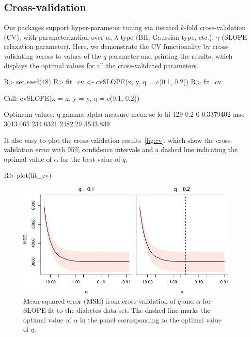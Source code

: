 \documentclass[article]{jss}
\makeatletter
\let\natwidth\Gin@nat@width
\makeatother
\begin{document}
\subsection{Cross-validation}

Our packages support hyper-parameter tuning via iterated \(k\)-fold
cross-validation (CV), with parameterization over \(\alpha\), \(\lambda\) type (BH,
Gaussian type, etc.), \(\gamma\) (SLOPE relaxation parameter).
Here, we demonstrate the CV functionality by cross-validating across
to values of the \(q\) parameter and printing the results,
which displays the optimal values for all the cross-validated parameters.

\begin{CodeChunk}
  \begin{CodeInput}
R> set.seed(48)
R> fit_cv <- cvSLOPE(x, y, q = c(0.1, 0.2))
R> fit_cv
\end{CodeInput}
  \begin{CodeOutput}
Call:
cvSLOPE(x = x, y = y, q = c(0.1, 0.2))

Optimum values:
      q gamma     alpha measure     mean       se      lo       hi
129 0.2     0 0.3379402     mse 3013.065 234.6321 2482.29 3543.839
\end{CodeOutput}
\end{CodeChunk}

It also easy to plot the cross-validation results~\autoref{fig:cv}, which
show the cross-validation error with 95\% confidence intervals and
a dashed line indicating the optimal value of \(\alpha\) for the
best value of \(q\).

\begin{Code}
R> plot(fit_cv)
\end{Code}

\begin{figure}[tp]
  \centering
  \includegraphics[width=\natwidth]{images/slope-cv.pdf}
  \caption{%
    Mean-squared error (MSE) from cross-validation of
    \(q\) and \(\alpha\) for SLOPE fit to the diabetes data set.
    The dashed line marks the optimal value of \(\alpha\) in the
    panel corresponding to the optimal value of \(q\).
  }
  \label{fig:cv}
\end{figure}
\end{document}
